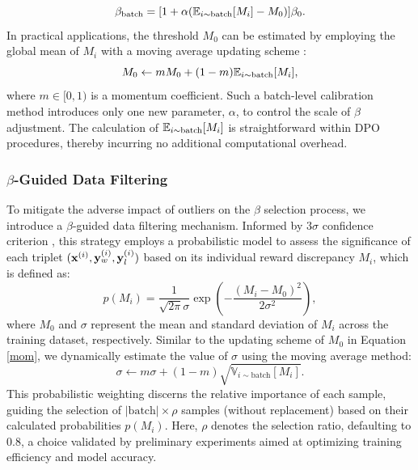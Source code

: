 \begin{equation}
    \beta_{\text{batch}} = [1 + \alpha( \mathbb{E}_{i \sim \text{batch}}[M_i]-M_0)]\beta_0.
\end{equation}
In practical applications, the threshold $M_0$ can be estimated by employing the global mean of $M_i$ with a moving average updating scheme \cite{mae}:
\begin{equation}
    M_0  \leftarrow m M_0 + (1-m)  \mathbb{E}_{i \sim \text{batch}}[M_i],
    \label{mom}
\end{equation}
where $m\in[0,1)$ is a momentum coefficient.
Such a batch-level calibration method introduces only one new parameter, $\alpha$, to control the scale of $\beta$ adjustment.
The calculation of $\mathbb{E}_{i \sim \text{batch}}[M_i]$ is straightforward within DPO procedures, thereby incurring no additional computational overhead.


\subsubsection{$\beta$-Guided Data Filtering }
To mitigate the adverse impact of outliers on the $\beta$ selection process, we introduce a $\beta$-guided data filtering mechanism. Informed by $3\sigma$ confidence criterion \cite{3sigma}, this strategy employs a probabilistic model to assess the significance of each triplet $(\mathbf{x}^{(i)}, \mathbf{y}_w^{(i)}, \mathbf{y}_l^{(i)})$ based on its individual reward discrepancy $M_i$, which is defined as:
\begin{equation}
    p(M_i) = \frac{1}{\sqrt{2\pi}\sigma} \exp\left(-\frac{(M_i-M_0)^2}{2\sigma^2}\right),
    \label{sampling_p}
\end{equation}
where $M_0$ and $\sigma$ represent the mean and standard deviation of $M_i$ across the training dataset, respectively.
Similar to the updating scheme of $M_0$ in Equation \eqref{mom}, we dynamically estimate the value of $\sigma$ using the moving average method:
\begin{equation}
     \sigma \leftarrow m \sigma + (1-m)  \sqrt{\mathbb{V}_{i \sim\text{batch}}[M_i]}.
     \label{mom2}
\end{equation}
This probabilistic weighting discerns the relative importance of each sample, guiding the selection of $|\text{batch}| \times \rho$ samples (without replacement) based on their calculated probabilities $p(M_i)$. Here, $\rho$ denotes the selection ratio, defaulting to 0.8, a choice validated by preliminary experiments aimed at optimizing training efficiency and model accuracy.


